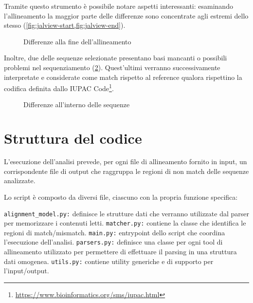 \documentclass[11pt,italian]{article}
\makeatletter
\newcommand*{\lstitem}[1][]{%
  \setbox0\hbox\bgroup
    \patchcmd{\lst@InlineM}{\@empty}{\@empty\egroup\item[\usebox0]\leavevmode\ignorespaces}{}{}%
    \lstinline[#1]%
}
\makeatother
\begin{document}
Tramite questo strumento è possibile notare aspetti interessanti: esaminando l'allineamento la maggior parte delle differenze sono concentrate agli estremi dello stesso (\cref{fig:jalview-start,fig:jalview-end}).

\begin{figure}[H]
  \caption{Differenze alla fine dell'allineamento}
  \label{fig:jalview-end}
\end{figure}

\vfill
Inoltre, due delle sequenze selezionate presentano basi mancanti o possibili problemi nel sequenziamento (\cref{fig:jalview-inner}).
Quest'ultimi verranno successivamente interpretate e considerate come match rispetto al reference qualora rispettino la codifica definita dallo IUPAC Code\footnote{\url{https://www.bioinformatics.org/sms/iupac.html}}.
\vfill

\begin{figure}[H]
  \caption{Differenze all'interno delle sequenze}
  \label{fig:jalview-inner}
\end{figure}

\newpage
\section{Struttura del codice}
L'esecuzione dell'analisi prevede, per ogni file di allineamento fornito in input, un corrispondente file di output che raggruppa le regioni di non match delle sequenze analizzate.

\noindent
Lo script è composto da diversi file, ciascuno con la propria funzione specifica:
\begin{description}
  \lstitem{alignment_model.py:} definisce le strutture dati che verranno utilizzate dal parser per memorizzare i contenuti letti.
  \lstitem{matcher.py:} contiene la classe che identifica le regioni di match/mismatch.
  \lstitem{main.py:} entrypoint dello script che coordina l'esecuzione dell'analisi.
  \lstitem{parsers.py:} definisce una classe per ogni tool di allineamento utilizzato per permettere di effettuare il parsing in una struttura dati omogenea.
  \lstitem{utils.py:} contiene utility generiche e di supporto per l'input/output.
\end{description}
\end{document}
